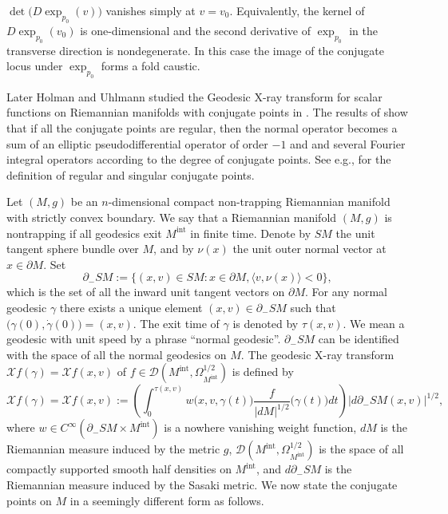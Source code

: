 \documentclass[a4paper,11pt,reqno]{amsart}
\theoremstyle{definition}
\theoremstyle{remark}
\begin{document}
$\det\bigl(D\exp_{p_0}(v)\bigr)$ vanishes simply at $v=v_0$.  
Equivalently, the kernel of $D\exp_{p_0}(v_0)$ is one-dimensional and 
the second derivative of $\exp_{p_0}$ in the transverse direction is nondegenerate. 
In this case the image of the conjugate locus under $\exp_{p_0}$ forms a fold caustic. 
%
%
\par
%
%
Later Holman and Uhlmann studied the Geodesic X-ray transform for scalar functions on Riemannian manifolds with conjugate points in \cite{HolmanUhlmann}. The results of \cite{HolmanUhlmann} show that if all the conjugate points are regular, then the normal operator becomes a sum of an elliptic pseudodifferential operator of order $-1$ and and several Fourier integral operators according to the degree of conjugate points. See e.g., \cite{HolmanUhlmann,Warner} for the definition of regular and singular conjugate points. 
%
\par
%
Let $(M,g)$ be an $n$-dimensional compact non-trapping Riemannian manifold with strictly convex boundary. We say that a Riemannian manifold $(M,g)$ is nontrapping if all geodesics exit $M^\text{int}$ in finite time. Denote by $SM$ the unit tangent sphere bundle over $M$, and by $\nu(x)$ the unit outer normal vector at $x\in\partial{M}$. Set 
%
%
$$
\partial_-SM
:=
\{(x,v) \in SM : x\in\partial{M}, \langle{v,\nu(x)}\rangle<0\},
$$
%
%
which is the set of all the inward unit tangent vectors on $\partial{M}$.  
For any normal geodesic $\gamma$ there exists a unique element $(x,v) \in \partial_-SM$ 
such that $\bigl(\gamma(0),\dot{\gamma}(0)\bigr)=(x,v)$. 
The exit time of $\gamma$ is denoted by $\tau(x,v)$. 
We mean a geodesic with unit speed by a phrase ``normal geodesic''. 
$\partial_-SM$ can be identified with the space of all the normal geodesics on $M$. 
The geodesic X-ray transform $\mathcal{X}f(\gamma)=\mathcal{X}f(x,v)$ 
of $f \in \mathcal{D}(M^\text{int},\Omega_{M^\text{int}}^{1/2})$ is defined by 
%
%
$$
\mathcal{X}f(\gamma)=\mathcal{X}f(x,v)
:=
\left(
\int_0^{\tau(x,v)}
w\bigl(x,v,\gamma(t)\bigr)
\frac{f}{\lvert{dM}\rvert^{1/2}}\bigl(\gamma(t)\bigr)
dt
\right)
\lvert{d\partial_-SM(x,v)}\rvert^{1/2},
$$
%
%
where $w \in C^\infty(\partial_-SM \times M^\text{int})$ is a nowhere vanishing weight function, 
$dM$ is the Riemannian measure induced by the metric $g$, 
$\mathcal{D}(M^\text{int},\Omega_{M^\text{int}}^{1/2})$ 
is the space of all compactly supported smooth half densities on $M^\text{int}$, 
and $d\partial_-SM$ is the Riemannian measure induced by the Sasaki metric. 
We now state the conjugate points on $M$ 
in a seemingly different form as follows. 
\end{document}
